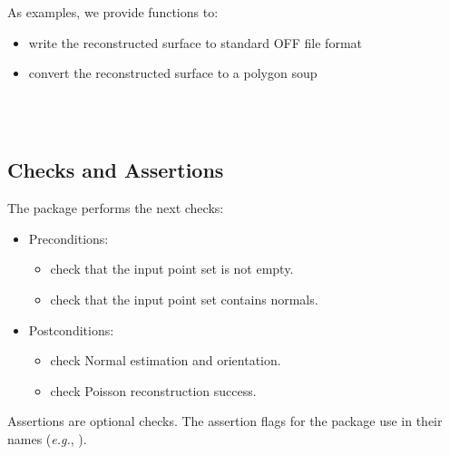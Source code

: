 As examples, we provide functions to:

\begin{itemize}
\item write the reconstructed surface to standard OFF file format
\item convert the reconstructed surface to a polygon soup
\end{itemize}

  \\
  \\


\subsection{Checks and Assertions}

The package performs the next checks:

\begin{itemize}
\item Preconditions:
    \begin{itemize}
    \item check that the input point set is not empty.
    \item check that the input point set contains normals.
    \end{itemize}
\item Postconditions:
    \begin{itemize}
    \item check Normal estimation and orientation.
    \item check Poisson reconstruction success.
    \end{itemize}
\end{itemize}

Assertions are optional checks. The assertion flags for the package
use  in their names (\textit{e.g.},
).


